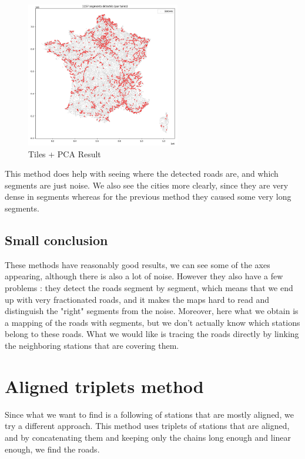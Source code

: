 \documentclass[main.tex]{subfiles}
\begin{document}
\begin{figure}[H]
    \centering
    \includegraphics[width=0.6\textwidth]{Images/Res_Tiles+PCA.png}
    \caption{Tiles + PCA Result}
\end{figure}

This method does help with seeing where the detected roads are, and which segments are just noise. We also see the cities more clearly, since they are very dense in segments whereas for the previous method they caused some very long segments.


\subsection{Small conclusion}

These methods have reasonably good results, we can see some of the axes appearing, although there is also a lot of noise. However they also have a few problems : they detect the roads segment by segment, which means that we end up with very fractionated roads, and it makes the maps hard to read and distinguish the "right" segments from the noise. Moreover, here what we obtain is a mapping of the roads with segments, but we don't actually know which stations belong to these roads. What we would like is tracing the roads directly by linking the neighboring stations that are covering them.


\section{Aligned triplets method}

Since what we want to find is a following of stations that are mostly aligned, we try a different approach. This method uses triplets of stations that are aligned, and by concatenating them and keeping only the chains long enough and linear enough, we find the roads. 
\end{document}
